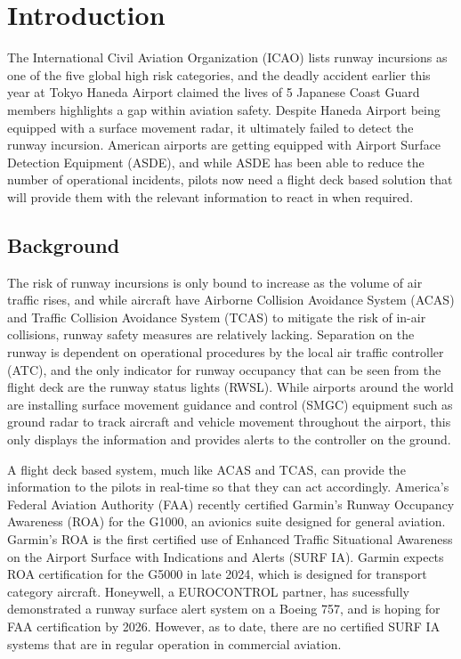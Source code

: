 

\chapter{Introduction}


The International Civil Aviation Organization (ICAO) lists runway incursions as one of the five global high risk categories, and the deadly accident earlier this year at Tokyo Haneda Airport claimed the lives of 5 Japanese Coast Guard members highlights a gap within aviation safety. Despite Haneda Airport being equipped with a surface movement radar, it ultimately failed to detect the runway incursion. American airports are getting equipped with Airport Surface Detection Equipment (ASDE), and while ASDE has been able to reduce the number of operational incidents, pilots now need a flight deck based solution that will provide them with the relevant information to react in when required.

\section{Background}


The risk of runway incursions is only bound to increase as the volume of air traffic rises, and while aircraft have Airborne Collision Avoidance System (ACAS) and Traffic Collision Avoidance System (TCAS) to mitigate the risk of in-air collisions, runway safety measures are relatively lacking. Separation on the runway is dependent on operational procedures by the local air traffic controller (ATC), and the only indicator for runway occupancy that can be seen from the flight deck are the runway status lights (RWSL). While airports around the world are installing surface movement guidance and control (SMGC) equipment such as ground radar to track aircraft and vehicle movement throughout the airport, this only displays the information and provides alerts to the controller on the ground. 

A flight deck based system, much like ACAS and TCAS, can provide the information to the pilots in real-time so that they can act accordingly. America's Federal Aviation Authority (FAA) recently certified Garmin's Runway Occupancy Awareness (ROA) for the G1000, an avionics suite designed for general aviation. Garmin's ROA is the first certified use of Enhanced Traffic Situational Awareness on the Airport Surface with Indications and Alerts (SURF IA). Garmin expects ROA certification for the G5000 in late 2024, which is designed for transport category aircraft. Honeywell, a EUROCONTROL partner, has sucessfully demonstrated a runway surface alert system on a Boeing 757, and is hoping for FAA certification by 2026. However, as to date, there are no certified SURF IA systems that are in regular operation in commercial aviation. 

